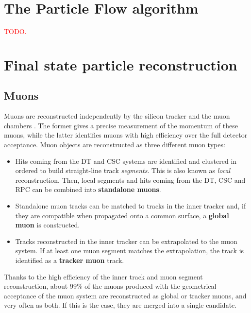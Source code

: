 \documentclass[../main.tex]{subfiles}
\begin{document}
\section{The Particle Flow algorithm}

\textcolor{red}{TODO.}

\section{Final state particle reconstruction}

\subsection{Muons}
\label{intro:subsec:muon}

Muons are reconstructed independently by the silicon tracker and the muon chambers \cite{intro:id:muon_7tev}. The former gives a precise measurement of the momentum of these muons, while the latter identifies muons with high efficiency over the full detector acceptance. Muon objects are reconstructed as three different muon types:
\begin{itemize}
\item Hits coming from the DT and CSC systems are identified and clustered in ordered to build straight-line track \textit{segments}. This is also known as \textit{local} reconstruction. Then, local segments and hits coming from the DT, CSC and RPC can be combined into \textbf{standalone muons}.
\item Standalone muon tracks can be matched to tracks in the inner tracker and, if they are compatible when propagated onto a common surface, a \textbf{global muon} is constructed.
\item Tracks reconstructed in the inner tracker can be extrapolated to the muon system. If at least one muon segment matches the extrapolation, the track is identified as a \textbf{tracker muon} track.
\end{itemize}

Thanks to the high efficiency of the inner track and muon segment reconstruction, about 99\% of the muons produced with the geometrical acceptance of the muon system are reconstructed as global or tracker muons, and very often as both. If this is the case, they are merged into a single candidate.
\end{document}
